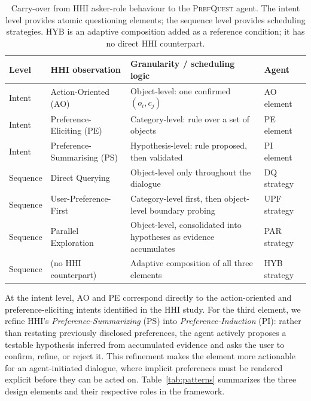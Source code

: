 \documentclass[manuscript,review,anonymous]{acmart}
\begin{document}
\begin{table}[t]
\centering
\caption{Carry-over from HHI asker-role behaviour to the \textsc{PrefQuest} agent. The intent level provides atomic questioning elements; the sequence level provides scheduling strategies. HYB is an adaptive composition added as a reference condition; it has no direct HHI counterpart.}
\label{tab:hhi-carryover}
\small
\begin{tabularx}{\linewidth}{@{} l l >{\raggedright\arraybackslash}X l @{}}
\toprule
\textbf{Level} & \textbf{HHI observation} & \textbf{Granularity / scheduling logic} & \textbf{Agent} \\
\midrule
Intent & Action-Oriented (AO) & Object-level: one confirmed $(o_i, c_j)$ & AO element \\
Intent & Preference-Eliciting (PE) & Category-level: rule over a set of objects & PE element \\
Intent & Preference-Summarising (PS) & Hypothesis-level: rule proposed, then validated & PI element \\
\midrule
Sequence & Direct Querying & Object-level only throughout the dialogue & DQ strategy \\
Sequence & User-Preference-First & Category-level first, then object-level boundary probing & UPF strategy \\
Sequence & Parallel Exploration & Object-level, consolidated into hypotheses as evidence accumulates & PAR strategy \\
Sequence & (no HHI counterpart) & Adaptive composition of all three elements & HYB strategy \\
\bottomrule
\end{tabularx}
\end{table}

At the intent level, AO and PE correspond directly to the action-oriented and preference-eliciting intents identified in the HHI study. For the third element, we refine HHI's \textit{Preference-Summarizing} (PS) into \textit{Preference-Induction} (PI): rather than restating previously disclosed preferences, the agent actively proposes a testable hypothesis inferred from accumulated evidence and asks the user to confirm, refine, or reject it. This refinement makes the element more actionable for an agent-initiated dialogue, where implicit preferences must be rendered explicit before they can be acted on. Table~\ref{tab:patterns} summarizes the three design elements and their respective roles in the framework.
\end{document}
